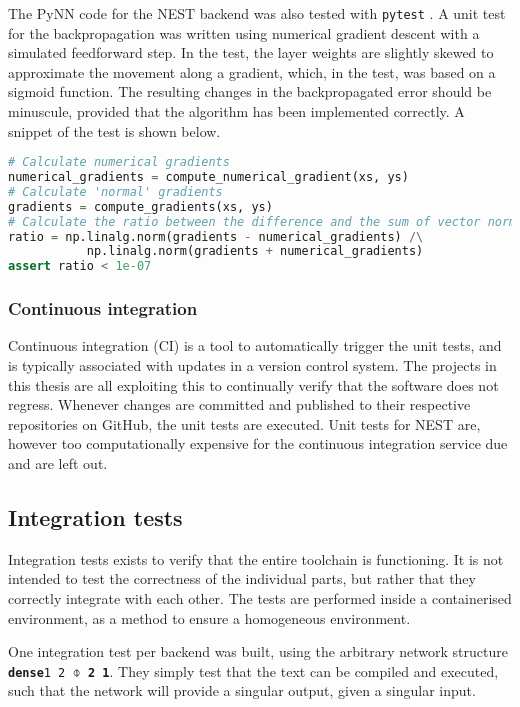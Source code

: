 The PyNN code for the NEST backend was also tested with \texttt{pytest}
\cite{Pytest2018}.
A unit test for the backpropagation was written using numerical gradient descent
with a simulated feedforward step.
In the test, the layer weights are slightly skewed to approximate the movement
along a gradient, which, in the test, was based on a sigmoid function.
The resulting changes in the backpropagated error should be minuscule, provided
that the algorithm has been implemented correctly.
A snippet of the test is shown below.

\begin{minipage}{\linewidth}
\begin{lstlisting}[language=Python,label={lst:volrpynn_numerical},caption={Part
of the numerical gradient test for the densely connected layer in PyNN.}]
# Calculate numerical gradients
numerical_gradients = compute_numerical_gradient(xs, ys)
# Calculate 'normal' gradients
gradients = compute_gradients(xs, ys)
# Calculate the ratio between the difference and the sum of vector norms
ratio = np.linalg.norm(gradients - numerical_gradients) /\
           np.linalg.norm(gradients + numerical_gradients)
assert ratio < 1e-07
\end{lstlisting}
\end{minipage}

\subsubsection{Continuous integration}
Continuous integration (CI) is a tool to automatically trigger the unit tests, and is
typically associated with updates in a version control system. \index{Continuous
integration}
The projects in this thesis are all exploiting this to continually verify that
the software does not regress.
Whenever changes are committed and published to their respective repositories on
GitHub, the unit tests are executed.
Unit tests for NEST are, however too computationally expensive for the
continuous integration service due and are left out.

\subsection{Integration tests}
Integration tests exists to verify that the entire toolchain is functioning.
It is not intended to test the correctness of the individual parts, but rather
that they correctly integrate with each other.
The tests are performed inside a containerised environment, as a
method to ensure a homogeneous environment. 

One integration test per backend was built, using the arbitrary network
structure \texttt{\textbf{dense}1 2 $\obar$ \textbf{2 1}}. 
They simply test that the text can be compiled and executed, such that the
network will provide a singular output, given a singular input.

